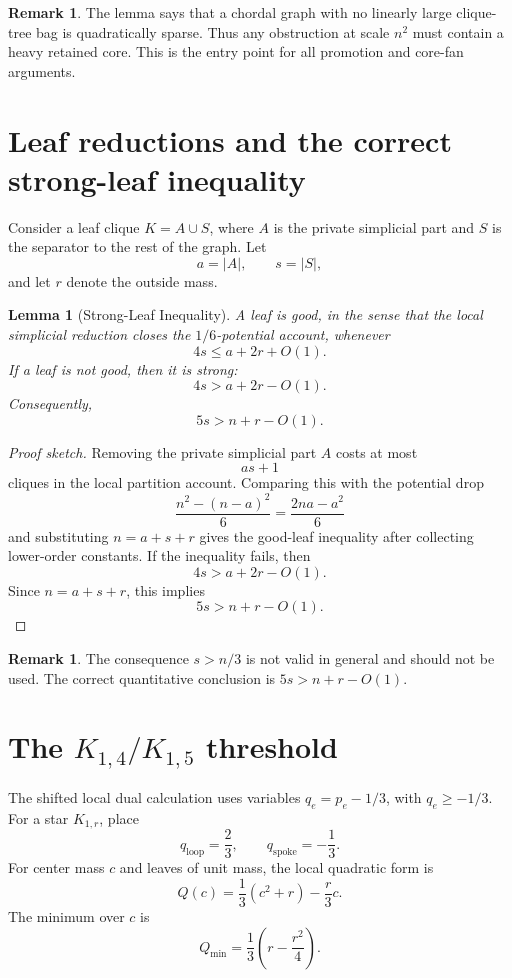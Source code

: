 \documentclass[11pt]{article}
\newtheorem{lemma}[theorem]{Lemma}
\theoremstyle{definition}
\newtheorem{remark}[theorem]{Remark}
\begin{document}
\begin{remark}
The lemma says that a chordal graph with no linearly large clique-tree bag is quadratically sparse. Thus any obstruction at scale \(n^2\) must contain a heavy retained core. This is the entry point for all promotion and core-fan arguments.
\end{remark}

\section{Leaf reductions and the correct strong-leaf inequality}

Consider a leaf clique \(K=A\cup S\), where \(A\) is the private simplicial part and \(S\) is the separator to the rest of the graph. Let
\[
    a=|A|,\qquad s=|S|,
\]
and let \(r\) denote the outside mass.

\begin{lemma}[Strong-Leaf Inequality]\label{lem:strong-leaf}
A leaf is good, in the sense that the local simplicial reduction closes the \(1/6\)-potential account, whenever
\[
    4s\le a+2r+O(1).
\]
If a leaf is not good, then it is strong:
\[
    4s>a+2r-O(1).
\]
Consequently,
\[
    5s>n+r-O(1).
\]
\end{lemma}

\begin{proof}[Proof sketch]
Removing the private simplicial part \(A\) costs at most
\[
    as+1
\]
cliques in the local partition account. Comparing this with the potential drop
\[
    \frac{n^2-(n-a)^2}{6}
    =
    \frac{2na-a^2}{6}
\]
and substituting \(n=a+s+r\) gives the good-leaf inequality after collecting lower-order constants. If the inequality fails, then
\[
    4s>a+2r-O(1).
\]
Since \(n=a+s+r\), this implies
\[
    5s>n+r-O(1).
\]
\end{proof}

\begin{remark}
The consequence \(s>n/3\) is not valid in general and should not be used. The correct quantitative conclusion is \(5s>n+r-O(1)\).
\end{remark}

\section{The \(K_{1,4}/K_{1,5}\) threshold}

The shifted local dual calculation uses variables \(q_e=p_e-1/3\), with \(q_e\ge -1/3\). For a star \(K_{1,r}\), place
\[
    q_{\text{loop}}=\frac23,
    \qquad
    q_{\text{spoke}}=-\frac13.
\]
For center mass \(c\) and leaves of unit mass, the local quadratic form is
\[
    Q(c)=\frac13(c^2+r)-\frac r3c.
\]
The minimum over \(c\) is
\[
    Q_{\min}
    =
    \frac13\left(r-\frac{r^2}{4}\right).
\]
\end{document}
